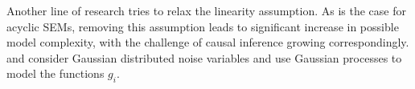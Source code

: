 Another line of research tries to relax the linearity assumption. 
As is the case for acyclic SEMs, removing this assumption leads to significant increase in possible model complexity, with the challenge of causal inference growing correspondingly. \cite{mooij2011causal} and \cite{mooij2013cyclic} consider Gaussian distributed noise variables and use Gaussian processes to model the functions $g_i$.

%
%
%
%
%
%
